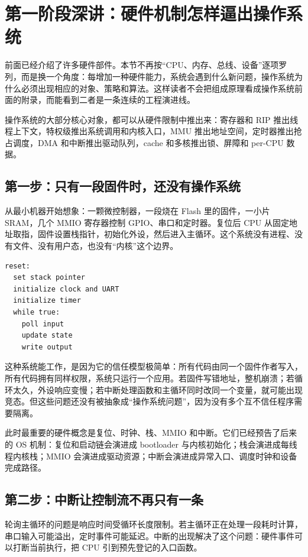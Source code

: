 \section{第一阶段深讲：硬件机制怎样逼出操作系统}

前面已经介绍了许多硬件部件。本节不再按“CPU、内存、总线、设备”逐项罗列，而是换一个角度：每增加一种硬件能力，系统会遇到什么新问题，操作系统为什么必须出现相应的对象、策略和算法。这样读者不会把组成原理看成操作系统前面的附录，而能看到二者是一条连续的工程演进线。

\begin{keyidea}
操作系统的大部分核心对象，都可以从硬件限制中推出来：寄存器和 RIP 推出线程上下文，特权级推出系统调用和内核入口，MMU 推出地址空间，定时器推出抢占调度，DMA 和中断推出驱动队列，cache 和多核推出锁、屏障和 per-CPU 数据。
\end{keyidea}

\subsection{第一步：只有一段固件时，还没有操作系统}

从最小机器开始想象：一颗微控制器，一段烧在 Flash 里的固件，一小片 SRAM，几个 MMIO 寄存器控制 GPIO、串口和定时器。复位后 CPU 从固定地址取指，固件设置栈指针，初始化外设，然后进入主循环。这个系统没有进程、没有文件、没有用户态，也没有“内核”这个边界。

\begin{lstlisting}
reset:
  set stack pointer
  initialize clock and UART
  initialize timer
  while true:
    poll input
    update state
    write output
\end{lstlisting}

这种系统能工作，是因为它的信任模型极简单：所有代码由同一个固件作者写入，所有代码拥有同样权限，系统只运行一个应用。若固件写错地址，整机崩溃；若循环太久，外设响应变慢；若中断处理函数和主循环同时改同一个变量，就可能出现竞态。但这些问题还没有被抽象成“操作系统问题”，因为没有多个互不信任程序需要隔离。

此时最重要的硬件概念是复位、时钟、栈、MMIO 和中断。它们已经预告了后来的 OS 机制：复位和启动链会演进成 bootloader 与内核初始化；栈会演进成每线程内核栈；MMIO 会演进成驱动资源；中断会演进成异常入口、调度时钟和设备完成路径。

\subsection{第二步：中断让控制流不再只有一条}

轮询主循环的问题是响应时间受循环长度限制。若主循环正在处理一段耗时计算，串口输入可能溢出，定时事件可能延迟。中断的出现解决了这个问题：硬件事件可以打断当前执行，把 CPU 引到预先登记的入口函数。

